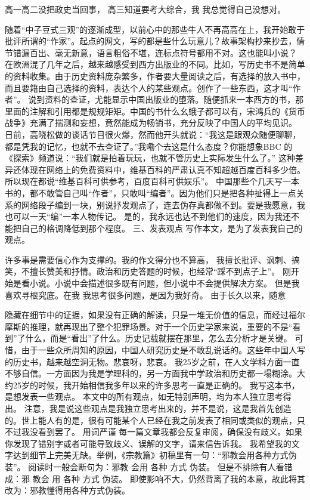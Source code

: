 高一高二没把政史当回事，
高三知道要考大综合，我
我总觉得自己没想对。

随着“中子豆式三观”的逐渐成型，以前心中的那些牛人不再高高在上，我开始敢于批评所谓的“作家”。起点的网文，写的都是些什么玩意儿？故事架构抄来抄去，情节错漏百出、毫无新意，语言粗俗不堪，连标点符号都用不对。这也能叫小说？
在欧洲混了几年之后，越来越感受到西方出版业的不同。比如，写历史书不是简单的资料收集。由于历史资料庞杂繁多，作者要大量阅读之后，有选择的放入书中，而且要籍由自己选择的资料，表达个人的某些观点。创作了一些东西，这才叫“作者”。
说到资料的查证，尤能显示中国出版业的堕落。随便抓来一本西方的书，那里面的注解和引用都是规规矩矩。中国的书什么幺蛾子都可以有，宋鸿兵的《货币战争》充满了揣测和妄想，竟然能成为畅销书，充分反映了中国人的平均见识。
日前，高晓松做的谈话节目很火爆，然而他开头就说：“我这是跟观众随便聊聊，都是凭我的记忆，也就不去查证了。”我嘞个去这是什么态度？你能想象BBC 的《探索》频道说：“我们就是拍着玩玩，也就不管历史上实际发生什么了。”
这种差异还体现在网络上的免费资料中，维基百科的严肃认真不知超越百度百科多少倍。所以现在都说“维基百科可供参考，百度百科可供娱乐”。
中国那些个几天写一本书的，都不敢管自己叫“作者”，只敢叫“编者”。因为他们只是把各种扯得上一点关系的网络段子编到一块，别说抒发观点了，连去伪存真都做不到。要是我愿意，我也可以一天“编”一本人物传记。
是的，我永远也达不到他们的速度，因为我还不能把自己的格调降低到那个程度。
三、发表观点
写作本文，是为了发表我自己的观点。

许多事是需要信心作为支撑的。我的作文得分也不算高，
我擅长批评、讽刺、搞笑，不擅长赞美和抒情。政治和历史答题的时候，也经常“踩不到点子上”。
刚开始是看小说。小说中会描述很多既有问题，但小说中不会提供解决方案。
但是我喜欢寻根究底。在我
我思考很多问题，是因为我好奇。
由于长久以来，随意


隐藏在细节中的证据，如果没有正确的解读，只是一堆无价值的信息，而经过福尔摩斯的推理，就再现出了整个犯罪场景。对于一个历史学家来说，重要的不是“看到”了什么，而是“看出”了什么。历史记载就摆在那里，怎么去分析才是关键。
可惜，由于一些众所周知的原因，中国人研究历史是不敢乱说话的。这些年中国人写的历史书，越来越空洞无物。悲哀呀，悲哀。
我25岁之前，在人文学科方面一直不够自信。一方面因为我是学理科的，另一方面我中学政治和历史都一塌糊涂。大约25岁的时候，我开始相信我多年以来的许多思考一直是正确的。
我写这本书，是想发表一些观点。
本文中的所有观点，如无特别声明，均为本人独立思考得出。
注意，我是说这些观点是我独立思考出来的，并不是说，这是我首先创造的。世上能人有的是，很有可能某个人已经在我之前发表了相同或类似的观点，只不过我没看到罢了。
用词严谨
每一篇文章我都会反复审阅，确保没有歧义。如果你发现了错别字或者可能导致歧义、误解的文字，请来信告诉我。
我希望我的文字达到细节上完美无缺。举例，《宗教篇》初稿里有一句：“邪教会用各种方式伪装”。
阅读时一般会断句为：邪教 会用 各种 方式 伪装。
但是不排除有人看错成：邪 教会 用 各种 方式 伪装。
即使影响不大，仍然背离了我的本意，故此将其改为：邪教懂得用各种方式伪装。

